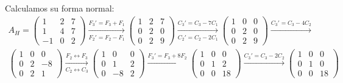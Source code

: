 \begin{ejercicio}
\begin{enumerate}
        Calculamos su forma normal:
        \begin{multline*}
            A_H = \begin{pmatrix}
                1 & 2 & 7 \\
                1 & 4 & 7 \\
                -1 & 0 & 2
            \end{pmatrix}
            \xrightarrow[F_2'=F_2-F_1]{F_3'=F_3+F_1}
            \begin{pmatrix}
                1 & 2 & 7 \\
                0 & 2 & 0 \\
                0 & 2 & 9
            \end{pmatrix}
            \xrightarrow[C_2'=C_2-2C_1]{C_3'=C_3-7C_1}
            \begin{pmatrix}
                1 & 0 & 0 \\
                0 & 2 & 0 \\
                0 & 2 & 9
            \end{pmatrix}
            \xrightarrow{C_3'=C_3-4C_2}\\
            \begin{pmatrix}
                1 & 0 & 0 \\
                0 & 2 & -8 \\
                0 & 2 & 1
            \end{pmatrix}
            \xrightarrow[C_2\leftrightarrow C_3]{F_2\leftrightarrow F_3}
            \begin{pmatrix}
                1 & 0 & 0 \\
                0 & 1 & 2 \\
                0 & -8 & 2
            \end{pmatrix}
            \xrightarrow{F_3'=F_3+8F_2}
            \begin{pmatrix}
                1 & 0 & 0 \\
                0 & 1 & 2 \\
                0 & 0 & 18
            \end{pmatrix}
            \xrightarrow{C_3'=C_3-2C_2}
            \begin{pmatrix}
                1 & 0 & 0 \\
                0 & 1 & 0 \\
                0 & 0 & 18
            \end{pmatrix}
        \end{multline*}

\end{enumerate}
\end{ejercicio}
